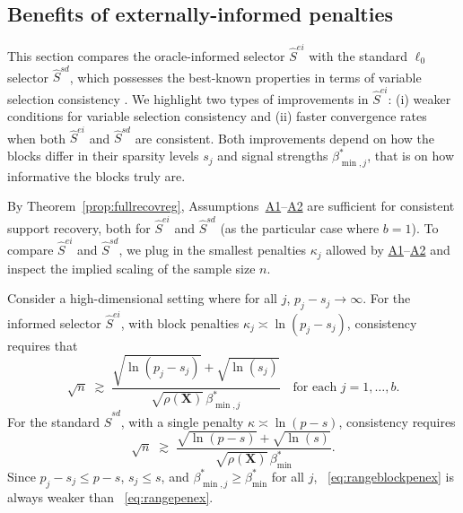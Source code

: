 \documentclass[
  12pt]{article}
\newcommand{\bX}{\mathbf{X}}
\begin{document}
\subsection{Benefits of externally-informed penalties}\label{ssec:regression_gains}

This section compares the oracle-informed selector $\hat S^{ei}$ with the standard $\ell_0$ selector $\hat S^{sd}$, which possesses the best-known properties 
in terms of variable selection consistency \citep{gao2025optimalityl0}.
We highlight two types of improvements in $\hat S^{ei}$: 
(i) weaker conditions for variable selection consistency and (ii) faster convergence rates when both $\hat S^{ei}$ and $\hat S^{sd}$ are consistent.
Both improvements depend on how the blocks differ in their sparsity levels $s_j$ and signal strengths $\beta_{\min,j}^*$, that is on how informative the blocks truly are.

By Theorem~\ref{prop:fullrecovreg}, Assumptions~\hyperlink{lab:A1}{A1}–\hyperlink{lab:A2}{A2} are sufficient for consistent support recovery, both for $\hat S^{ei}$ and $\hat S^{sd}$ (as the particular case where $b=1$).
To compare $\hat S^{ei}$ and $\hat S^{sd}$, we plug in the smallest penalties $\kappa_j$  allowed by \hyperlink{lab:A1}{A1}–\hyperlink{lab:A2}{A2} and inspect the implied scaling of the sample size $n$.

Consider a high-dimensional setting where for all $j$, $p_j-s_j\to\infty$. For the informed selector $\hat S^{ei}$, with block penalties $\kappa_j \asymp \ln(p_j-s_j)$, consistency requires that
\begin{equation}\label{eq:rangeblockpenex}
\sqrt{n}
\;\gtrsim\;
\frac{\sqrt{\ln(p_j-s_j)}+\sqrt{\ln(s_j)}}{\sqrt{\rho(\bX)}\,\beta^*_{\min,j}}\quad\text{for each }j=1,\ldots,b.
\end{equation}
For the standard $\hat S^{sd}$, with a single penalty $\kappa \asymp \ln(p-s)$, consistency requires
\begin{equation}\label{eq:rangepenex}
\sqrt{n}
\;\gtrsim\;
\frac{\sqrt{\ln(p-s)}+\sqrt{\ln(s)}}{\sqrt{\rho(\bX)}\,\beta^*_{\min}}.
\end{equation}
Since $p_j-s_j \le p-s$, $s_j \le s$, and $\beta^*_{\min,j} \ge \beta^*_{\min}$ for all $j$, ~\eqref{eq:rangeblockpenex} is always weaker than ~\eqref{eq:rangepenex}.
\end{document}
